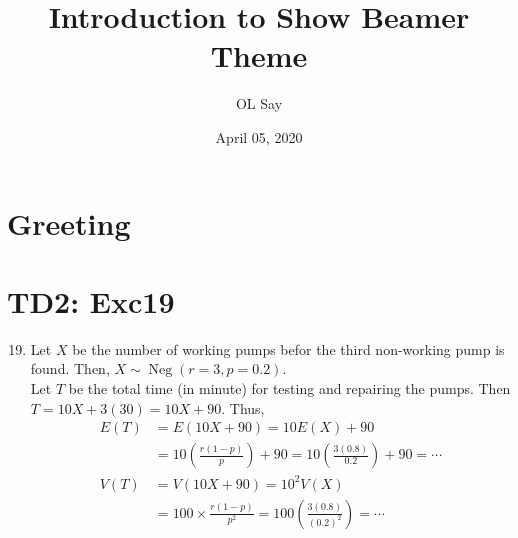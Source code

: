\documentclass[serif,handout,t]{beamer}
\title[Show Theme]{Introduction to Show Beamer Theme}
\author[Say]{OL Say}
\date[04/05/20]{April 05, 2020}
\institute[TEC]{Teacher Education College}
\begin{document}
    \section{Greeting}
    \begin{frame}
        \titlepage
    \end{frame}
    \section{TD2: Exc19}
    \begin{frame}[allowframebreaks]
        \begin{enumerate}
            \setcounter{enumi}{18}
            \item Let $ X $ be the number of working pumps befor the third non-working pump is found. Then, $ X\sim\operatorname{Neg}(r=3,p=0.2). $\\
            Let $ T $ be the total time (in minute) for testing and repairing the pumps. Then $ T=10X+3(30)=10X+90. $ Thus,
            \begin{align*}
            E(T) &=E(10X+90)=10E(X)+90\\
            &=10\left( \frac{r(1-p)}{p} \right)+90
            =10\left( \frac{3(0.8)}{0.2} \right)+90
            =\cdots\\
            V(T) &=V(10X+90)=10^{2}V(X)\\
            &=100\times \frac{r(1-p)}{p^{2}}
            =100\left( \frac{3(0.8)}{(0.2)^{2}} \right)=\cdots
            \end{align*}
        \end{enumerate}
    \end{frame}
\end{document}
